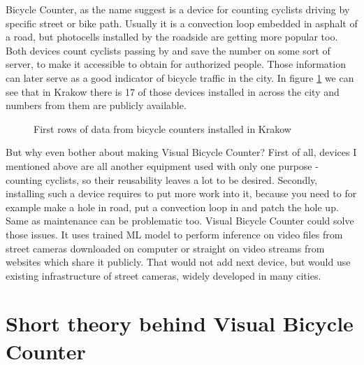 Bicycle Counter, as the name suggest is a device for counting cyclists driving by specific street or bike path. Usually it is a convection loop embedded in asphalt of a road, but photocells installed by the roadside are getting more popular too. Both devices count cyclists passing by and save the number on some sort of server, to make it accessible to obtain for authorized people. Those information can later serve as a good indicator of bicycle traffic in the city. In figure \ref{fig:countersKrakow} we can see that in Krakow there is 17 of those devices installed in across the city and numbers from them are publicly available.
\begin{figure}[H]
    \centering
    \caption{First rows of data from bicycle counters installed in Krakow \cite{mobilnykrakow}}
    \label{fig:countersKrakow}
\end{figure}
But why even bother about making Visual Bicycle Counter? First of all, devices I mentioned above are all another equipment used with only one purpose - counting cyclists, so their reusability leaves a lot to be desired. Secondly, installing such a device requires to put more work into it, because you need to for example make a hole in road, put a convection loop in and patch the hole up. Same as maintenance can be problematic too. Visual Bicycle Counter could solve those issues. It uses trained ML model to perform inference on video files from street cameras downloaded on computer or straight on video streams from websites which share it publicly. That would not add next device, but would use existing infrastructure of street cameras, widely developed in many cities.



\section{Short theory behind Visual Bicycle Counter}
\label{sec:theory}

